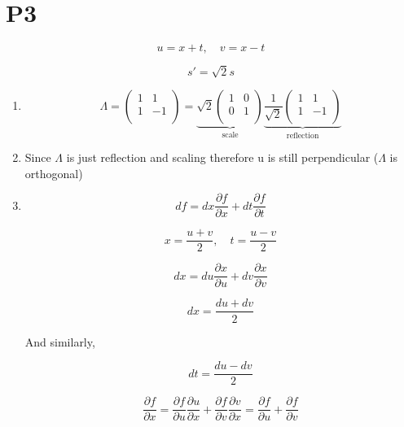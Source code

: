 \documentclass[12pt]{article}
\begin{document}
\newpage

\section{P3}
\renewcommand{\labelenumi}{(\roman{enumi})}

\[
    u = x + t, \quad v = x - t
\]

\[
    s' = \sqrt{2}s
\]

\begin{enumerate}
    \item
          \[
              \Lambda = \begin{pmatrix}
                  1 & 1  \\
                  1 & -1 \\
              \end{pmatrix}
              =\underbrace{\sqrt{2} \begin{pmatrix}
                      1 & 0 \\
                      0 & 1 \\
                  \end{pmatrix}}_{\text{scale}} \underbrace{\frac{1}{\sqrt{2}}\begin{pmatrix}
                      1 & 1  \\
                      1 & -1 \\
                  \end{pmatrix}}_{\text{reflection}}
          \]
    \item
          Since $\Lambda$ is just reflection and scaling therefore u is still perpendicular ($\Lambda$ is orthogonal)
    \item
          \[
              df = dx \frac{\partial f}{\partial x}  + dt \frac{\partial f}{\partial t}
          \]

          \[
              x = \frac{u + v}{2},\quad t = \frac{u - v}{2}
          \]

          \[
              dx = du \frac{\partial x}{\partial u}  + dv \frac{\partial x}{\partial v}
          \]

          \[
              dx = \frac{du + dv}{2}
          \]

          And similarly,

          \[
              dt = \frac{du - dv}{2}
          \]

          \[
              \frac{\partial f}{\partial x}
              = \frac{\partial f}{\partial u} \frac{\partial u}{\partial x} + \frac{\partial f}{\partial v} \frac{\partial v}{\partial x}
              = \frac{\partial f}{\partial u} + \frac{\partial f}{\partial v}
          \]


\end{enumerate}
\end{document}
